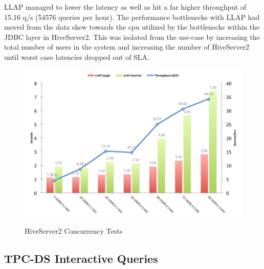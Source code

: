 LLAP managed to lower the latency as well as hit a far higher throughput of 15.16 q/s (54576 queries per hour). The 
performance bottlenecks with LLAP had moved from the data skew towards the cpu utilized by the bottlenecks within
the JDBC layer in HiveServer2. This was isolated from the use-case by increasing the total number of users in the system and
increasing the number of HiveServer2 until worst case latencies dropped out of SLA.


\begin{figure}[!h]
\centering
\includegraphics[width=0.9\columnwidth]{figures/throughput.pdf}
\label{fig:throughput}
\caption{HiveServer2 Concurrency Tests}
\end{figure}

\subsection{TPC-DS Interactive Queries}

